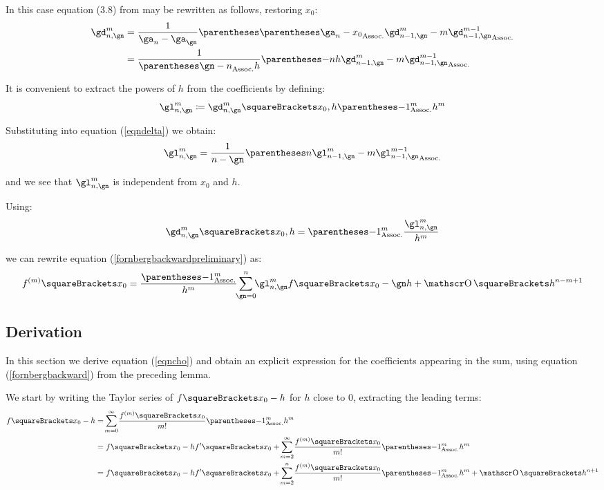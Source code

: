 \documentclass[10pt, a4paper, twoside]{basestyle}
\begin{document}
In this case equation (3.8) from \cite{Fornberg1988} may be rewritten as follows, restoring $x_0$:
\begin{align}
\gd^{m}_{n,\gn} &= \frac{1}{\ga_n - \ga_\gn}\pa{\pa{\ga_n - x_0} \gd^{m}_{n - 1,\gn} - m \gd^{m - 1}_{n - 1,\gn}} \nonumber \\
&= \frac{1}{\pa{\gn - n} h} \pa{-n h \gd^{m}_{n - 1,\gn} - m \gd^{m - 1}_{n - 1,\gn}} \label{eqndelta}
\end{align}

It is convenient to extract the powers of $h$ from the coefficients by defining:
\[
\gl^{m}_{n,\gn} \DefineAs \gd^{m}_{n,\gn}\of{x_0, h} \pa{-1}^m h^m
\]

Substituting into equation (\ref{eqndelta}) we obtain:
\[
\gl^{m}_{n,\gn} = \frac{1}{n - \gn} \pa{n \gl^{m}_{n - 1,\gn} - m \gl^{m - 1}_{n - 1,\gn}}
\]

and we see that $\gl^{m}_{n,\gn}$ is independent from $x_0$ and $h$.

Using:
\[
\gd^{m}_{n,\gn}\of{x_0, h} = \pa{-1}^m \frac{\gl^{m}_{n,\gn}}{h^m}
\]

we can rewrite equation (\ref{fornbergbackwardpreliminary}) as:
\begin{equation}
f^{(m)}\of{x_0} = \frac{\pa{-1}^m}{h^m} \sum{\gn = 0}[n]{\gl^{m}_{n,\gn} f\of{x_0 - \gn h}} + \BigO\of{h^{n - m + 1}}
\label{fornbergbackward}
\end{equation}


\subsection*{Derivation}
In this section we derive equation (\ref{eqncho}) and obtain an explicit expression for the coefficients appearing in the sum, using equation (\ref{fornbergbackward}) from the preceding lemma.

We start by writing the Taylor series of $f\of{x_0 - h}$ for $h$ close to $0$, extracting the leading terms:
\begin{align}
f\of{x_0 - h} &= \sum{m = 0}[\infty]{\frac{f^{(m)}\of{x_0}}{\Factorial{m}} \pa{-1}^m h^m} \nonumber \\
&=f\of{x_0} - h f\der\of{x_0} + \sum{m = 2}[\infty]{\frac{f^{(m)}\of{x_0}}{\Factorial{m}} \pa{-1}^m h^m} \nonumber \\
&=f\of{x_0} - h f\der\of{x_0} + \sum{m = 2}[n]{\frac{f^{(m)}\of{x_0}}{\Factorial{m}} \pa{-1}^m h^m} + \BigO\of{h^{n+1}} \label{eqntaylorn}
\end{align}
\end{document}
